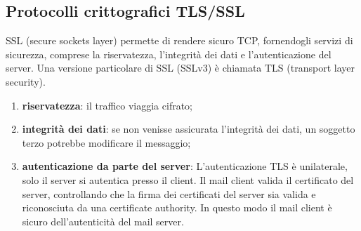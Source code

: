 \subsection{Protocolli crittografici TLS/SSL}
SSL (secure sockets layer) permette di rendere sicuro TCP,  fornendogli servizi di sicurezza, 
comprese la riservatezza, l’integrità dei dati e l’autenticazione del server. 
Una versione particolare di SSL (SSLv3) è chiamata TLS (transport layer security).\cite{tls}

\begin{enumerate}
    \item \textbf{riservatezza}: il traffico viaggia cifrato;
    \item \textbf{integrità dei dati}: se non venisse assicurata l'integrità dei dati, un soggetto terzo
    potrebbe modificare il messaggio;
    \item \textbf{autenticazione da parte del server}: L'autenticazione TLS è unilaterale, solo il server si 
    autentica presso il client. Il mail client valida il certificato del server, controllando che la firma dei 
    certificati del server sia valida e riconosciuta da una certificate authority.
    In questo modo il mail client è sicuro dell'autenticità del mail server. 
\end{enumerate}


